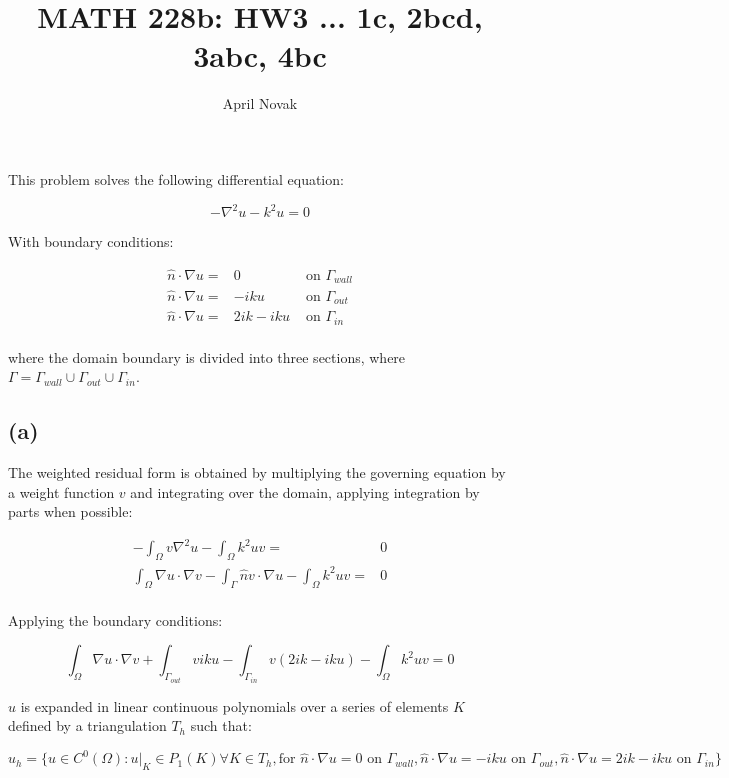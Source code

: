 \documentclass[10pt]{article}
\newcommand{\beq}{\begin{equation}}
\newcommand{\eeq}{\end{equation}}
\newcommand{\beqa}{\begin{equation}\begin{aligned}}
\newcommand{\eeqa}{\end{aligned}\end{equation}}
\begin{document}
\title{MATH 228b: HW3 ... 1c, 2bcd, 3abc, 4bc}
\author{April Novak}

\maketitle

\section{}

This problem solves the following differential equation:

\beq
\label{eq:prob}
-\nabla^2 u-k^2u=0
\eeq

With boundary conditions:

\beqa
\label{eq:BCs}
\hat{n}\cdot\nabla u=&0 & \textrm{ on } \Gamma_{wall}\\
\hat{n}\cdot\nabla u=&-iku & \textrm{ on } \Gamma_{out}\\
\hat{n}\cdot\nabla u=&2ik-iku & \textrm{ on } \Gamma_{in}\\
\eeqa

where the domain boundary is divided into three sections, where \(\Gamma=\Gamma_{wall}\cup\Gamma_{out}\cup\Gamma_{in}\). 

\subsection{(a)}

The weighted residual form is obtained by multiplying the governing equation by a weight function \(v\) and integrating over the domain, applying integration by parts when possible:

\beqa
-\int_{\Omega}v\nabla^2 u-\int_{\Omega}k^2uv=& 0\\
\int_{\Omega}\nabla u\cdot\nabla v-\int_{\Gamma}\hat{n}v\cdot\nabla u-\int_{\Omega}k^2uv=&0\\
\eeqa

Applying the boundary conditions:

\beq
\int_{\Omega}\nabla u\cdot\nabla v+\int_{\Gamma_{out}}viku-\int_{\Gamma_{in}}v(2ik-iku)-\int_{\Omega}k^2uv=0
\eeq

\(u\) is expanded in linear continuous polynomials over a series of elements \(K\) defined by a triangulation \(T_h\) such that:

\beq
u_h=\{u\in C^0(\Omega):u\rvert_K\in P_1(K)\forall K\in T_h, \textrm{for } \hat{n}\cdot\nabla u=0 \textrm{ on } \Gamma_{wall}, \hat{n}\cdot\nabla u=-iku \textrm{ on } \Gamma_{out}, \hat{n}\cdot\nabla u=2ik-iku \textrm{ on } \Gamma_{in}\}
\eeq
\end{document}
